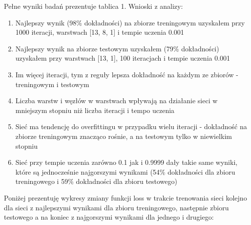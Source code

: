 \documentclass[12pt]{article}
\begin{document}
Pełne wyniki badań prezentuje tablica 1. Wnioski z analizy:
\begin{enumerate}
  \item Najlepszy wynik (98\% dokładności) na zbiorze treningowym uzyskałem przy 1000 iteracji, warstwach [13, 8, 1] i tempie uczenia 0.001
  \item Najlepszy wynik na zbiorze testowym uzyskałem (79\% dokładności) uzyskałem przy warstwach [13, 1], 100 iteracjach  i tempie uczenia 0.001
  \item Im więcej iteracji, tym z reguły lepsza dokładność na każdym ze zbiorów - treningowym i testowym
  \item Liczba warstw i węzłów w warstwach wpływają na działanie sieci w mniejszym stopniu niż liczba iteracji i tempo uczenia
  \item Sieć ma tendencję do overfittingu w przypadku wielu iteracji - dokładność na zbiorze treningowym znacząco rośnie, a na testowym tylko w niewielkim stopniu
  \item Sieć przy tempie uczenia zarówno 0.1 jak i 0.9999 dały takie same wyniki, które są jednocześnie najgorszymi wynikami (54\% dokładności dla zbioru treningowego i 59\% dokładności dla zbioru testowego)
\end{enumerate}


Poniżej prezentuję wykresy zmiany funkcji loss w trakcie trenowania sieci kolejno dla sieci z najlepszymi wynikami dla zbioru treningowego, następnie zbioru testowego a na koniec z najgorszymi wynikami dla jednego i drugiego:
\end{document}
